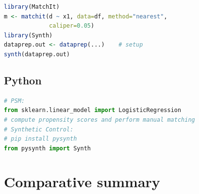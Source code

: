 \begin{lstlisting}[language=R, basicstyle=\ttfamily\small,
  frame=single, numbers=none, backgroundcolor=\color{codbg},
  keywordstyle=\color{keyword}\bfseries,
  stringstyle=\color{string},
  commentstyle=\color{comment}\itshape]
library(MatchIt)
m <- matchit(d ~ x1, data=df, method="nearest",
             caliper=0.05)
library(Synth)
dataprep.out <- dataprep(...)    # setup
synth(dataprep.out)
\end{lstlisting}

\subsection*{Python}

\begin{lstlisting}[language=Python, basicstyle=\ttfamily\small,
  frame=single, numbers=none, backgroundcolor=\color{codbg},
  keywordstyle=\color{keyword}\bfseries,
  stringstyle=\color{string},
  commentstyle=\color{comment}\itshape]
# PSM:
from sklearn.linear_model import LogisticRegression
# compute propensity scores and perform manual matching
# Synthetic Control:
# pip install pysynth
from pysynth import Synth
\end{lstlisting}

\section{Comparative summary}

